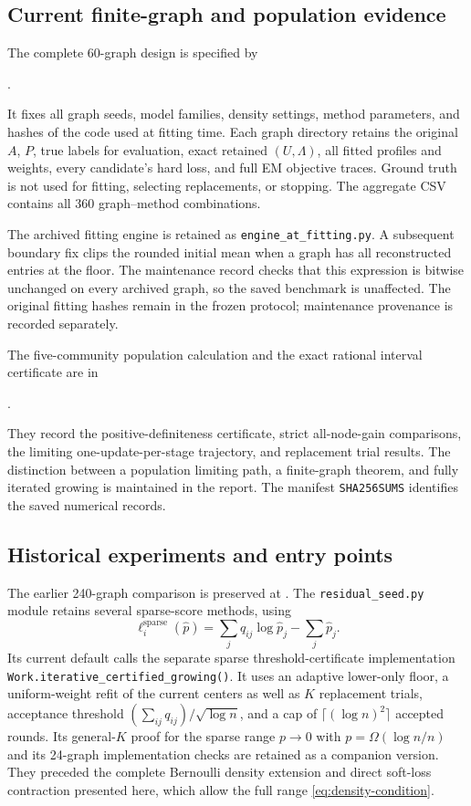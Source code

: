 \documentclass[11pt]{article}
\theoremstyle{definition}
\theoremstyle{remark}
\numberwithin{equation}{section}
\begin{document}
\subsection{Current finite-graph and population evidence}
The complete 60-graph design is specified by
\begin{center}
\small{}.
\end{center}
It fixes all graph seeds, model families, density settings, method parameters, and hashes of the code used at fitting time. Each graph directory retains the original $A$, $P$, true labels for evaluation, exact retained $(U,\Lambda)$, all fitted profiles and weights, every candidate's hard loss, and full EM objective traces. Ground truth is not used for fitting, selecting replacements, or stopping. The aggregate CSV contains all 360 graph--method combinations.

The archived fitting engine is retained as \texttt{engine\_at\_fitting.py}. A subsequent boundary fix clips the rounded initial mean when a graph has all reconstructed entries at the floor. The maintenance record checks that this expression is bitwise unchanged on every archived graph, so the saved benchmark is unaffected. The original fitting hashes remain in the frozen protocol; maintenance provenance is recorded separately.

The five-community population calculation and the exact rational interval certificate are in
\begin{center}
\small{}.
\end{center}
They record the positive-definiteness certificate, strict all-node-gain comparisons, the limiting one-update-per-stage trajectory, and replacement trial results. The distinction between a population limiting path, a finite-graph theorem, and fully iterated growing is maintained in the report. The manifest \texttt{SHA256SUMS} identifies the saved numerical records.

\subsection{Historical experiments and entry points}
The earlier 240-graph comparison is preserved at
.
The \texttt{residual\_seed.py} module retains several sparse-score methods, using
\[
 \ell_i^{\mathrm{sparse}}(\widehat p)=\sum_jq_{ij}\log\widehat p_j-\sum_j\widehat p_j.
\]
Its current default  calls the separate sparse threshold-certificate implementation \texttt{Work.iterative\_certified\_growing()}. It uses an adaptive lower-only floor, a uniform-weight refit of the current centers as well as $K$ replacement trials, acceptance threshold $(\sum_{ij}q_{ij})/\sqrt{\log n}$, and a cap of $\lceil(\log n)^2\rceil$ accepted rounds. Its general-$K$ proof for the sparse range $p\to0$ with $p=\Omega(\log n/n)$ and its 24-graph implementation checks are retained as a companion version. They preceded the complete Bernoulli density extension and direct soft-loss contraction presented here, which allow the full range \eqref{eq:density-condition}.
\end{document}
